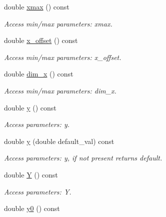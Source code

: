 \begin{DoxyCompactItemize}
double \hyperlink{struct_d_d4hep_1_1_x_m_l_1_1_child_value_a9554fb0926ceaaf4e97a8a9b1a0c9305}{xmax} () const 
\begin{DoxyCompactList}\small\item\em Access min/max parameters: xmax. \item\end{DoxyCompactList}\item 
double \hyperlink{struct_d_d4hep_1_1_x_m_l_1_1_child_value_a24a2b33be08ebef85fc8201164e5b523}{x\_\-offset} () const 
\begin{DoxyCompactList}\small\item\em Access min/max parameters: x\_\-offset. \item\end{DoxyCompactList}\item 
double \hyperlink{struct_d_d4hep_1_1_x_m_l_1_1_child_value_a846d222d0b881ab8da9caff1b4147126}{dim\_\-x} () const 
\begin{DoxyCompactList}\small\item\em Access min/max parameters: dim\_\-x. \item\end{DoxyCompactList}\item 
double \hyperlink{struct_d_d4hep_1_1_x_m_l_1_1_child_value_a7f599ff4a314d4ec1b92b50b0561cb46}{y} () const 
\begin{DoxyCompactList}\small\item\em Access parameters: y. \item\end{DoxyCompactList}\item 
double \hyperlink{struct_d_d4hep_1_1_x_m_l_1_1_child_value_a877c2405e3f03ed4a58333b003bb1f9a}{y} (double default\_\-val) const 
\begin{DoxyCompactList}\small\item\em Access parameters: y, if not present returns default. \item\end{DoxyCompactList}\item 
double \hyperlink{struct_d_d4hep_1_1_x_m_l_1_1_child_value_a167c3504adc36f2cadc97b1e7f539962}{Y} () const 
\begin{DoxyCompactList}\small\item\em Access parameters: Y. \item\end{DoxyCompactList}\item 
double \hyperlink{struct_d_d4hep_1_1_x_m_l_1_1_child_value_aa013bcfa03ef8e7c2ac5f3b99e6736dc}{y0} () const 

\end{DoxyCompactItemize}
